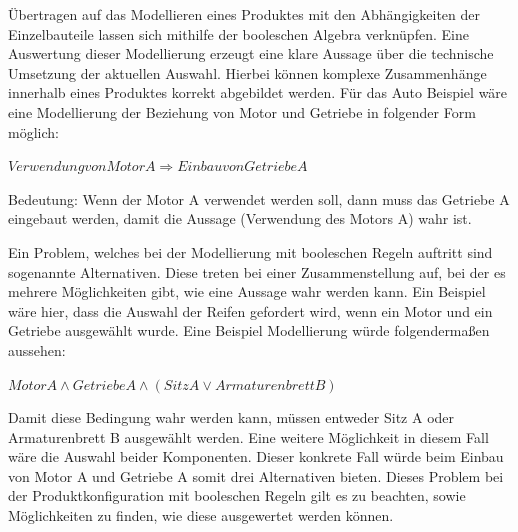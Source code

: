 Übertragen auf das Modellieren eines Produktes mit den Abhängigkeiten der Einzelbauteile lassen sich mithilfe der booleschen Algebra verknüpfen. Eine Auswertung dieser Modellierung erzeugt eine klare Aussage über die technische Umsetzung der aktuellen Auswahl. Hierbei können komplexe Zusammenhänge innerhalb eines Produktes korrekt abgebildet werden. Für das Auto Beispiel wäre eine Modellierung der Beziehung von Motor und Getriebe in folgender Form möglich: \par
\begin{center}
$ Verwendung von Motor A    \Rightarrow Einbau von Getriebe A $
\end{center} \par
Bedeutung: Wenn der Motor A verwendet werden soll, dann muss das Getriebe A eingebaut werden, damit die Aussage (Verwendung des Motors A) wahr ist. 
\par
Ein Problem, welches bei der Modellierung mit booleschen Regeln auftritt sind sogenannte Alternativen. Diese treten bei einer Zusammenstellung auf, bei der es mehrere Möglichkeiten gibt, wie eine Aussage wahr werden kann. Ein Beispiel wäre hier, dass die Auswahl der Reifen gefordert wird, wenn ein Motor und ein Getriebe ausgewählt wurde. Eine Beispiel Modellierung würde folgendermaßen aussehen: \par
\begin{center}
$ Motor A \wedge Getriebe A \wedge (Sitz A \vee Armaturenbrett B )  $
\end{center} \par
Damit diese Bedingung wahr werden kann, müssen entweder Sitz A oder Armaturenbrett B ausgewählt werden. Eine weitere Möglichkeit in diesem Fall wäre die Auswahl beider Komponenten. Dieser konkrete Fall würde beim Einbau von Motor A und Getriebe A somit drei Alternativen bieten. Dieses Problem bei der Produktkonfiguration mit booleschen Regeln gilt es zu beachten, sowie Möglichkeiten zu finden, wie diese ausgewertet werden können.


